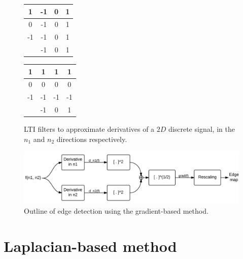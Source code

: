\documentclass[12pt]{amsart}
\begin{document}
\begin{figure}
\begin{minipage}[b]{0.45\linewidth}
\centering
\begin{tabular}{c || c | c | c }
 {\color{light-gray}1} & -1 & 0 & 1 \\
\hline
 {\color{light-gray}0} & -1 & 0 & 1 \\
\hline
 {\color{light-gray}-1} & -1 & 0 & 1 \\
\hline\hline
& {\color{light-gray}-1} & {\color{light-gray}0} & {\color{light-gray}1} \\
\end{tabular}
\end{minipage}
\hspace{0.5cm}
\begin{minipage}[b]{0.45\linewidth}
\centering
\begin{tabular}{c || c | c | c }
 {\color{light-gray}1} & 1 & 1 & 1 \\
\hline
 {\color{light-gray}0} & 0 & 0 & 0 \\
\hline
 {\color{light-gray}-1} & -1 & -1 & -1 \\
\hline\hline
& {\color{light-gray}-1} & {\color{light-gray}0} & {\color{light-gray}1} \\
\end{tabular}
\end{minipage}
\caption{LTI filters to approximate derivatives of a $2D$ discrete signal, in the $n_1$ and $n_2$ directions respectively.}
\label{fig:derivativefilters}
\end{figure}

\begin{figure}
\centering
\includegraphics[width=\linewidth]{GradientMethod.png}
\caption{Outline of edge detection using the gradient-based method.}
\label{fig:gradientmethod}
\end{figure}

\section{Laplacian-based method}
\end{document}
